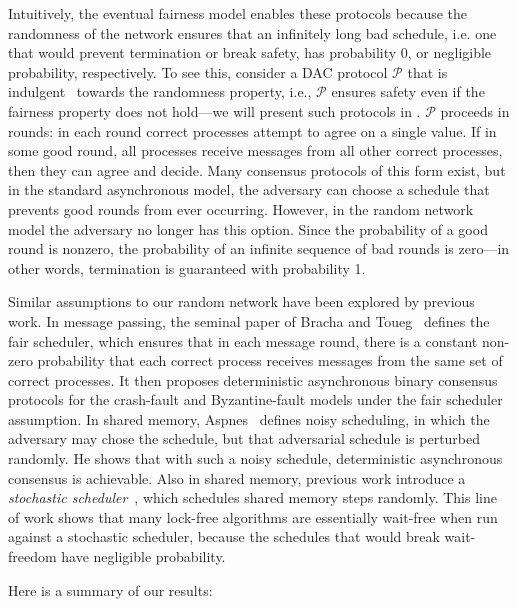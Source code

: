 Intuitively, the eventual fairness model enables these protocols because the randomness of the network ensures that an infinitely long bad schedule, i.e. one that would prevent termination or break safety, has probability $0$, or negligible probability, respectively. To see this, consider a DAC protocol $\mathcal{P}$ that is indulgent~\cite{indulgent-algs} towards the randomness property, i.e., $\mathcal{P}$ ensures safety even if the fairness property does not hold---we will present such protocols in . $\mathcal{P}$ proceeds in rounds: in each round correct processes attempt to agree on a single value. If in some good round, all processes receive messages from all other correct processes, then they can agree and decide. Many consensus protocols of this form exist, but in the standard asynchronous model, the adversary can choose a schedule that prevents good rounds from ever occurring. However, in the random network model the adversary no longer has this option. Since the probability of a good round is nonzero, the probability of an infinite sequence of bad rounds is zero---in other words, termination is guaranteed with probability 1. 

Similar assumptions to our random network have been explored by previous work. In message passing, the seminal paper of Bracha and Toueg~\cite{BrachaT85} defines the fair scheduler, which ensures that in each message round, there is a constant non-zero probability that each correct process receives messages from the same set of correct processes. It then proposes deterministic asynchronous binary consensus protocols for the crash-fault and Byzantine-fault models under the fair scheduler assumption. In shared memory, Aspnes~\cite{Aspnes02} defines noisy scheduling, in which the adversary may chose the schedule, but that adversarial schedule is perturbed randomly. He shows that with such a noisy schedule, deterministic asynchronous consensus is achievable. Also in shared memory, previous work introduce a \textit{stochastic scheduler}~\cite{AlistarhSV15,AlistarhCS16}, which schedules shared memory steps randomly. This line of work shows that many lock-free algorithms are essentially wait-free when run against a stochastic scheduler, because the schedules that would break wait-freedom have negligible probability. 

Here is a summary of our results:

